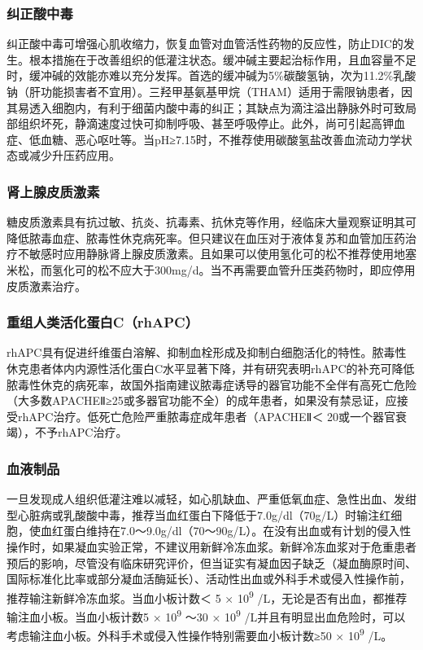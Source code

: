 \subsubsection{纠正酸中毒}

纠正酸中毒可增强心肌收缩力，恢复血管对血管活性药物的反应性，防止DIC的发生。根本措施在于改善组织的低灌注状态。缓冲碱主要起治标作用，且血容量不足时，缓冲碱的效能亦难以充分发挥。首选的缓冲碱为5\%碳酸氢钠，次为11.2\%乳酸钠（肝功能损害者不宜用）。三羟甲基氨基甲烷（THAM）适用于需限钠患者，因其易透入细胞内，有利于细菌内酸中毒的纠正；其缺点为滴注溢出静脉外时可致局部组织坏死，静滴速度过快可抑制呼吸、甚至呼吸停止。此外，尚可引起高钾血症、低血糖、恶心呕吐等。当pH≥7.15时，不推荐使用碳酸氢盐改善血流动力学状态或减少升压药应用。

\subsubsection{肾上腺皮质激素}

糖皮质激素具有抗过敏、抗炎、抗毒素、抗休克等作用，经临床大量观察证明其可降低脓毒血症、脓毒性休克病死率。但只建议在血压对于液体复苏和血管加压药治疗不敏感时应用静脉肾上腺皮质激素。且如果可以使用氢化可的松不推荐使用地塞米松，而氢化可的松不应大于300mg/d。当不再需要血管升压类药物时，即应停用皮质激素治疗。

\subsubsection{重组人类活化蛋白C（rhAPC）}

rhAPC具有促进纤维蛋白溶解、抑制血栓形成及抑制白细胞活化的特性。脓毒性休克患者体内内源性活化蛋白C水平显著下降，并有研究表明rhAPC的补充可降低脓毒性休克的病死率，故国外指南建议脓毒症诱导的器官功能不全伴有高死亡危险（大多数APACHEⅡ≥25或多器官功能不全）的成年患者，如果没有禁忌证，应接受rhAPC治疗。低死亡危险严重脓毒症成年患者（APACHEⅡ＜
20或一个器官衰竭），不予rhAPC治疗。

\subsubsection{血液制品}

一旦发现成人组织低灌注难以减轻，如心肌缺血、严重低氧血症、急性出血、发绀型心脏病或乳酸酸中毒，推荐当血红蛋白下降低于7.0g/dl（70g/L）时输注红细胞，使血红蛋白维持在7.0～9.0g/dl（70～90g/L）。在没有出血或有计划的侵入性操作时，如果凝血实验正常，不建议用新鲜冷冻血浆。新鲜冷冻血浆对于危重患者预后的影响，尽管没有临床研究评价，但当证实有凝血因子缺乏（凝血酶原时间、国际标准化比率或部分凝血活酶延长）、活动性出血或外科手术或侵入性操作前，推荐输注新鲜冷冻血浆。当血小板计数＜
5 × 10\textsuperscript{9}
/L，无论是否有出血，都推荐输注血小板。当血小板计数5 ×
10\textsuperscript{9} ～30 × 10\textsuperscript{9}
/L并且有明显出血危险时，可以考虑输注血小板。外科手术或侵入性操作特别需要血小板计数≥50
× 10\textsuperscript{9} /L。

